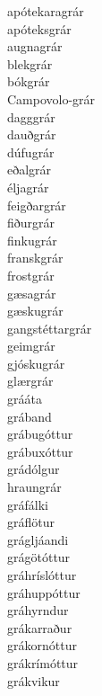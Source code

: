 \documentclass[../samsetningasafn.tex]{subfiles}
\begin{document}
\begin{bigwordlist}
\begin{footnotesize}
\begin{multicols}{4}
	\begin{description}
		\item [apótekaragrár]
		\item [apóteksgrár]
		\item [augnagrár]
		\item [blekgrár]
		\item [bókgrár]
		\item [Campovolo-grár]
		\item [dagggrár]
		\item [dauðgrár]
		\item [dúfugrár]
		\item [eðalgrár]
		\item [éljagrár]
		\item [feigðargrár]
		\item [fiðurgrár]
		\item [finkugrár]
		\item [franskgrár]
		\item [frostgrár]
		\item [gæsagrár]
		\item [gæskugrár]
		\item [gangstéttargrár]
		\item [geimgrár]
		\item [gjóskugrár]
		\item [glærgrár]
		\item [grááta]
		\item [gráband]
		\item [grábugóttur]
		\item [grábuxóttur]
		\item [grádólgur]
		\item [hraungrár]
		\item [gráfálki]
		\item [gráflötur]
		\item [grágljáandi]
		\item [grágötóttur]
		\item [gráhríslóttur]
		\item [gráhuppóttur]
		\item [gráhyrndur]
		\item [grákarraður]
		\item [grákornóttur]
		\item [grákrímóttur]
		\item [grákvikur]

\end{description}
\end{multicols}
\end{footnotesize}
\end{bigwordlist}
\end{document}
